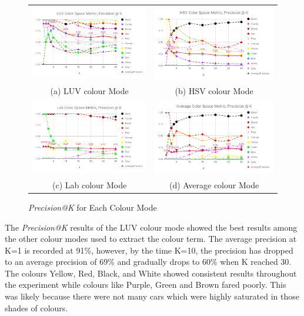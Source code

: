 \begin{figure}[htb!]
  \centering
\begin{tabular}{cc}
 \includegraphics[width=0.5\linewidth]{image/new/luv@k.png} &
 \includegraphics[width=0.5\linewidth]{image/new/hsv@k.png}\\
 (a) LUV colour Mode &
 (b) HSV colour Mode \\
 \includegraphics[width=0.5\linewidth]{image/new/lab@k.png} &
 \includegraphics[width=0.5\linewidth]{image/new/avg@k.png} \\
 (c) Lab colour Mode&
 (d) Average colour Mode \\
\end{tabular}
\caption{\textit{Precision@K} for Each Colour Mode}
  \label{fig:colorspace_score}
\end{figure}

The \textit{Precision@K} results of the LUV colour mode showed the best results
among the other colour modes used to extract the colour term. The average
precision at K=1 is recorded at 91\%, however, by the time K=10, the precision
has dropped to an average precision of 69\% and gradually drops to 60\% when K
reached 30. The colours Yellow, Red, Black, and White showed consistent results
throughout the experiment while colours like Purple, Green and Brown fared
poorly. This was likely because there were not many cars which were highly
saturated in those shades of colours.

